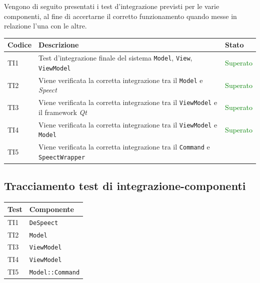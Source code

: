 \documentclass[openany,12pt,a4paper]{report}
\begin{document}
Vengono di seguito presentati i test d'integrazione previsti per le varie componenti, al fine di accertarne il corretto funzionamento quando messe in relazione l'una con le altre.

\setlength\LTleft{6mm}
\begin{longtable}{| p{2.5cm} |p{5cm} | p{2.5cm} |}
	\hline
	\textbf{Codice} & \textbf{Descrizione} & \textbf{Stato}\\
	\hline
	\endhead
	\newline TI1&
	\newline Test d'integrazione finale del sistema \verb|Model|, \verb|View|, \verb|ViewModel|&
	\newline \textcolor{green}{Superato}
	\\[1em]
	\hline
	\newline TI2&
	\newline Viene verificata la corretta integrazione tra il  \verb|Model| e \textit{Speect}&
	\newline \textcolor{green}{Superato}
	\\[1em]
	\hline
	\newline TI3&
	\newline Viene verificata la corretta integrazione tra il  \verb|ViewModel| e il framework \textit{Qt}&
	\newline \textcolor{green}{Superato} 
	\\[1em]
	\hline
	\newline TI4&
	\newline Viene verificata la corretta integrazione tra il  \verb|ViewModel| e \verb|Model|&
	\newline \textcolor{green}{Superato}
	\\[1em]
	\hline
	\newline TI5&
	\newline Viene verificata la corretta integrazione tra il  \verb|Command| e \verb|SpeectWrapper|&
	\newline \color{green}{Superato}
	\\[1em]
	\hline
\end{longtable}

\subsection{Tracciamento test di integrazione-componenti}

\begin{longtable}{| p{3cm} |p{6cm}|}
	\hline
	\textbf{Test} & \textbf{Componente}\\
	\hline
	\endhead
	TI1&\verb|DeSpeect|
	\\[1em]	
	\hline	
	TI2&\verb|Model|
	\\[1em]	
	\hline	
	TI3&\verb|ViewModel|
	\\[1em]	
	\hline	
	TI4&\verb|ViewModel|
	\\[1em]	
	\hline	
	TI5&\verb|Model::Command|
	\\[1em]
	\hline
\end{longtable}
\end{document}

